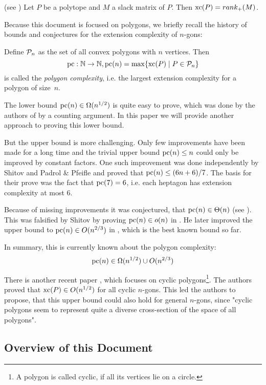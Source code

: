 \begin{theorem}(see \cite{yannakakis1991expressing})
  Let $P$ be a polytope and $M$ a slack matrix of $P$. Then $\xc(P) = rank_+(M)$.
\end{theorem}

Because this document is focused on polygons, we briefly recall the history of bounds and conjectures for the extension complexity of $n$-gons:

Define $\P_n$ as the set of all convex polygons with $n$ vertices. Then $$\pc:\N \to \N, \pc(n) = \max \{\xc(P) \mid P \in \P_n\}$$ is called the \textit{polygon complexity}, i.e. the largest extension complexity for a polygon of size~$n$.

The lower bound $\pc(n) \in \Omega(n^{1/2})$ is quite easy to prove, which was done by the authors of \cite{fiorini2012extended} by a counting argument. In this paper we will provide another approach to proving this lower bound. 

But the upper bound is more challenging. Only few improvements have been made for a long time and the trivial upper bound $\pc(n) \leq n$ could only be improved by constant factors. One such improvement was done independently by Shitov \cite{shitov2014upper} and Padrol \& Pfeifle \cite{padrol2014polygons} and proved that $\pc(n) \leq (6n+6)/7$. The basis for their prove was the fact that $\pc(7)=6$, i.e. each heptagon has extension complexity at most 6.

Because of missing improvements it was conjectured, that $\pc(n) \in \Theta(n)$ (see \cite{fiorini2012extended}). This was falsified by Shitov by proving $\pc(n) \in o(n)$ in \cite{shitov2014sublinear}. He later improved the upper bound to $\pc(n) \in O(n^{2/3})$ in \cite{shitov2020sublinear}, which is the best known bound so far.

In summary, this is currently known about the polygon complexity:
$$\pc(n) \in \Omega(n^{1/2}) \cup O(n^{2/3})$$

There is another recent paper \cite{kwan2020extension}, which focuses on cyclic polygons\footnote{A polygon is called cyclic, if all its vertices lie on a circle.}. The authors proved that $\xc(P) \in O(n^{1/2})$ for all cyclic $n$-gons. 
This led the authors to propose, that this upper bound could also hold for general $n$-gons, since "cyclic polygons seem to represent quite a diverse cross-section of the space of all polygons".



\subsection{Overview of this Document}

